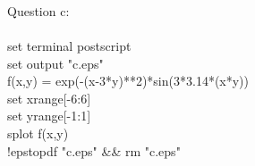 \documentclass[twocolumn]{article}
\begin{document}

\\
\\


\begin{listing}
\begin{indent}
\\
Question c:
\\
\\
set terminal postscript
\\
set output "c.eps"
\\
f(x,y) = exp(-(x-3*y)**2)*sin(3*3.14*(x*y))
\\
set xrange[-6:6]
\\
set yrange[-1:1]
\\
splot f(x,y)
\\
!epstopdf "c.eps" && rm "c.eps"
\end{indent}
\end{listing}

\end{document}
